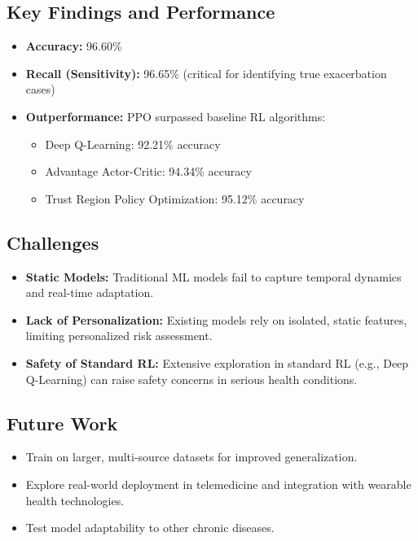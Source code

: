 \subsection*{Key Findings and Performance}
\begin{itemize}
    \item \textbf{Accuracy:} 96.60\%
    \item \textbf{Recall (Sensitivity):} 96.65\% (critical for identifying true exacerbation cases)
    \item \textbf{Outperformance:} PPO surpassed baseline RL algorithms:
    \begin{itemize}
        \item Deep Q-Learning: 92.21\% accuracy
        \item Advantage Actor-Critic: 94.34\% accuracy
        \item Trust Region Policy Optimization: 95.12\% accuracy
    \end{itemize}
\end{itemize}

\subsection*{Challenges}
\begin{itemize}
    \item \textbf{Static Models:} Traditional ML models fail to capture temporal dynamics and real-time adaptation.
    \item \textbf{Lack of Personalization:} Existing models rely on isolated, static features, limiting personalized risk assessment.
    \item \textbf{Safety of Standard RL:} Extensive exploration in standard RL (e.g., Deep Q-Learning) can raise safety concerns in serious health conditions.
\end{itemize}

\subsection*{Future Work}
\begin{itemize}
    \item Train on larger, multi-source datasets for improved generalization.
    \item Explore real-world deployment in telemedicine and integration with wearable health technologies.
    \item Test model adaptability to other chronic diseases.
\end{itemize}

